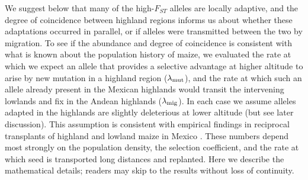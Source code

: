 We suggest below that many of the high-$F_{ST}$ alleles are locally adaptive,
and the degree of coincidence between highland regions informs us about 
whether these adaptations occurred in parallel, 
or if alleles were transmitted between the two by migration.
To see if the abundance and degree of coincidence is consistent with what is known about the population history of maize,
we evaluated the rate at which we expect an allele that provides a selective advantage at higher altitude
to arise by new mutation in a highland region ($\lambda_{\text{mut}}$),
and the rate at which such an allele already present in the Mexican highlands
would transit the intervening lowlands and fix in the Andean highlands ($\lambda_{\text{mig}}$). 
In each case we assume alleles adapted in the highlands are slightly deleterious at lower altitude (but see later discussion).  
This assumption is consistent with empirical findings in reciprocal transplants of highland and lowland maize in Mexico \citep{Mercer2008}.
These numbers depend most strongly on the population density, 
the selection coefficient,
and the rate at which seed is transported long distances and replanted.
Here we describe the mathematical details;
readers may skip to the results without loss of continuity.

